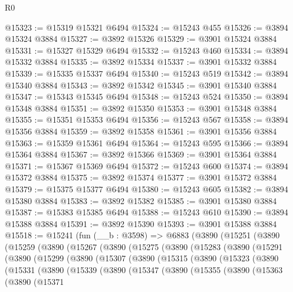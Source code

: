 \begin{lexlean}{R0}
\begin{coremodule}
@15323 := @15319 @15321 @6494
@15324 := @15243 @455
@15326 := @3894 @15324 @3884
@15327 := @3892 @15326
@15329 := @3901 @15324 @3884
@15331 := @15327 @15329 @6494
@15332 := @15243 @460
@15334 := @3894 @15332 @3884
@15335 := @3892 @15334
@15337 := @3901 @15332 @3884
@15339 := @15335 @15337 @6494
@15340 := @15243 @519
@15342 := @3894 @15340 @3884
@15343 := @3892 @15342
@15345 := @3901 @15340 @3884
@15347 := @15343 @15345 @6494
@15348 := @15243 @524
@15350 := @3894 @15348 @3884
@15351 := @3892 @15350
@15353 := @3901 @15348 @3884
@15355 := @15351 @15353 @6494
@15356 := @15243 @567
@15358 := @3894 @15356 @3884
@15359 := @3892 @15358
@15361 := @3901 @15356 @3884
@15363 := @15359 @15361 @6494
@15364 := @15243 @595
@15366 := @3894 @15364 @3884
@15367 := @3892 @15366
@15369 := @3901 @15364 @3884
@15371 := @15367 @15369 @6494
@15372 := @15243 @600
@15374 := @3894 @15372 @3884
@15375 := @3892 @15374
@15377 := @3901 @15372 @3884
@15379 := @15375 @15377 @6494
@15380 := @15243 @605
@15382 := @3894 @15380 @3884
@15383 := @3892 @15382
@15385 := @3901 @15380 @3884
@15387 := @15383 @15385 @6494
@15388 := @15243 @610
@15390 := @3894 @15388 @3884
@15391 := @3892 @15390
@15393 := @3901 @15388 @3884
@15518 := @15241
    (fun (__b : @3598) =>
    @6883
      (@3890
        (@15251
          (@3890
            (@15259
              (@3890
                (@15267
                  (@3890
                    (@15275
                      (@3890
                        (@15283
                          (@3890
                            (@15291
                              (@3890
                                (@15299
                                  (@3890
                                    (@15307
                                      (@3890
                                        (@15315
                                          (@3890
                                            (@15323
                                              (@3890
                                                (@15331
                                                  (@3890
                                                    (@15339
                                                      (@3890
                                                        (@15347
                                                          (@3890
                                                            (@15355
                                                              (@3890
                                                                (@15363
                                                                  (@3890
                                                                    (@15371

\end{coremodule}
\end{lexlean}
